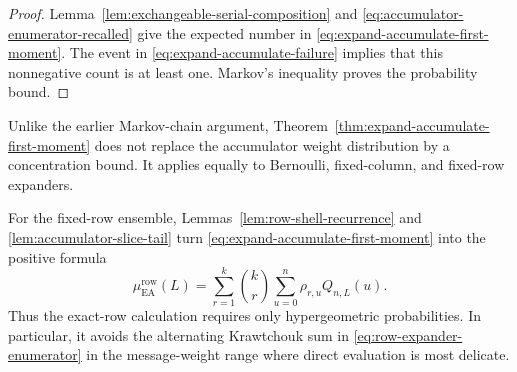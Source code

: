 \begin{proof}
Lemma~\ref{lem:exchangeable-serial-composition} and
\eqref{eq:accumulator-enumerator-recalled} give the expected number in
\eqref{eq:expand-accumulate-first-moment}.  The event in
\eqref{eq:expand-accumulate-failure} implies that this nonnegative count is at
least one.  Markov's inequality proves the probability bound.
\end{proof}

Unlike the earlier Markov-chain argument, Theorem~\ref{thm:expand-accumulate-first-moment}
does not replace the accumulator weight distribution by a concentration bound.
It applies equally to Bernoulli, fixed-column, and fixed-row expanders.

For the fixed-row ensemble, Lemmas~\ref{lem:row-shell-recurrence} and
\ref{lem:accumulator-slice-tail} turn
\eqref{eq:expand-accumulate-first-moment} into the positive formula
\begin{equation}
 \boxed{
 \mu_{\mathrm{EA}}^{\mathrm{row}}(L)
 =\sum_{r=1}^{k}\binom{k}{r}
   \sum_{u=0}^{n}\rho_{r,u}Q_{n,L}(u).
 }
 \label{eq:row-expand-accumulate-positive-first-moment}
\end{equation}
Thus the exact-row calculation requires only hypergeometric probabilities.
In particular, it avoids the alternating Krawtchouk sum in
\eqref{eq:row-expander-enumerator} in the message-weight range where direct
evaluation is most delicate.
